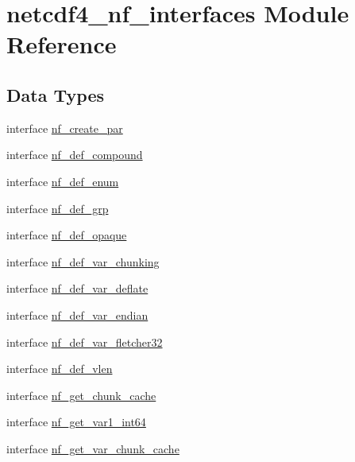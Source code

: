 \hypertarget{namespacenetcdf4__nf__interfaces}{}\section{netcdf4\+\_\+nf\+\_\+interfaces Module Reference}
\label{namespacenetcdf4__nf__interfaces}
\subsection*{Data Types}
\begin{DoxyCompactItemize}
\item 
interface \hyperlink{interfacenetcdf4__nf__interfaces_1_1nf__create__par}{nf\+\_\+create\+\_\+par}
\item 
interface \hyperlink{interfacenetcdf4__nf__interfaces_1_1nf__def__compound}{nf\+\_\+def\+\_\+compound}
\item 
interface \hyperlink{interfacenetcdf4__nf__interfaces_1_1nf__def__enum}{nf\+\_\+def\+\_\+enum}
\item 
interface \hyperlink{interfacenetcdf4__nf__interfaces_1_1nf__def__grp}{nf\+\_\+def\+\_\+grp}
\item 
interface \hyperlink{interfacenetcdf4__nf__interfaces_1_1nf__def__opaque}{nf\+\_\+def\+\_\+opaque}
\item 
interface \hyperlink{interfacenetcdf4__nf__interfaces_1_1nf__def__var__chunking}{nf\+\_\+def\+\_\+var\+\_\+chunking}
\item 
interface \hyperlink{interfacenetcdf4__nf__interfaces_1_1nf__def__var__deflate}{nf\+\_\+def\+\_\+var\+\_\+deflate}
\item 
interface \hyperlink{interfacenetcdf4__nf__interfaces_1_1nf__def__var__endian}{nf\+\_\+def\+\_\+var\+\_\+endian}
\item 
interface \hyperlink{interfacenetcdf4__nf__interfaces_1_1nf__def__var__fletcher32}{nf\+\_\+def\+\_\+var\+\_\+fletcher32}
\item 
interface \hyperlink{interfacenetcdf4__nf__interfaces_1_1nf__def__vlen}{nf\+\_\+def\+\_\+vlen}
\item 
interface \hyperlink{interfacenetcdf4__nf__interfaces_1_1nf__get__chunk__cache}{nf\+\_\+get\+\_\+chunk\+\_\+cache}
\item 
interface \hyperlink{interfacenetcdf4__nf__interfaces_1_1nf__get__var1__int64}{nf\+\_\+get\+\_\+var1\+\_\+int64}
\item 
interface \hyperlink{interfacenetcdf4__nf__interfaces_1_1nf__get__var__chunk__cache}{nf\+\_\+get\+\_\+var\+\_\+chunk\+\_\+cache}

\end{DoxyCompactItemize}
